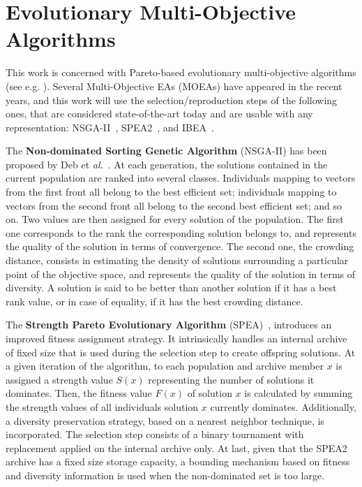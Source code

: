 \documentclass[a4paper,10pt]{article}
\begin{document}
\section{Evolutionary Multi-Objective Algorithms}
\label{sec:evolutionaryMOA}

This work is concerned with Pareto-based evolutionary multi-objective algorithms (see e.g. \cite{Deb-book}). Several Multi-Objective EAs (MOEAs) have appeared in the recent years, and this work will use the selection/reproduction steps of the following ones, that are considered state-of-the-art today and  are usable with any representation: NSGA-II~\cite{Deb2002}, SPEA2~\cite{Zitzler2001}, and IBEA~\cite{Zitzler2004}.


The {\bf Non-dominated Sorting Genetic Algorithm} (NSGA-II) has been proposed by Deb et \textit{al.}~\cite{Deb2002}. %
At each generation,  the solutions contained in the current  population are ranked into several classes. 
Individuals mapping to vectors from the first front all belong to
the best efficient set; individuals mapping to vectors from the second front all belong to the second best efficient set; and so on.
Two values are then assigned for every solution of the population. The first one corresponds to the rank  the corresponding solution
belongs to, and represents the quality of the solution in terms of convergence. The second one, the crowding distance, consists in
estimating the density of solutions surrounding a particular point of the objective space, and represents the quality of the solution in
terms of diversity.  A solution is said to be better than another solution if it has a best rank value, or in case of equality, if it has
the best crowding distance.

The {\bf Strength Pareto Evolutionary Algorithm} (SPEA)~\cite{Zitzler2001}, introduces an improved fitness assignment strategy. It intrinsically handles an internal archive of fixed size that is used during the selection step to create offspring solutions. At a given iteration of the algorithm, to each population and archive member $x$ is assigned a strength value $S(x)$ representing the number
of solutions it dominates. Then, the fitness value $F (x)$ of solution $x$ is calculated by summing the strength values of all individuals solution $x$ currently dominates. Additionally,
a diversity preservation strategy, based on a nearest neighbor technique, is incorporated.
The selection step consists of a binary tournament with replacement applied on the internal archive only.
At last, given that the SPEA2 archive has a fixed size storage capacity, a bounding mechanism based on fitness and diversity information is used when the non-dominated set is too large. 
\end{document}
